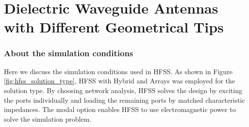 \documentclass[a4paper,12pt]{report}
\begin{document}
\chapter{Dielectric Waveguide Antennas with Different Geometrical Tips}


\subsection{About the simulation conditions}

Here we discuss the simulation conditions used in HFSS.
As shown in Figure \ref{fig:hfss_solution_type},
HFSS with Hybrid and Arrays was employed for the solution type.
By choosing network analysis,
HFSS solves the design by exciting the ports individually
and loading the remaining ports by matched characteristic impedances.
The modal option enables HFSS to use electromagnetic power to solve the simulation problem.
\end{document}
